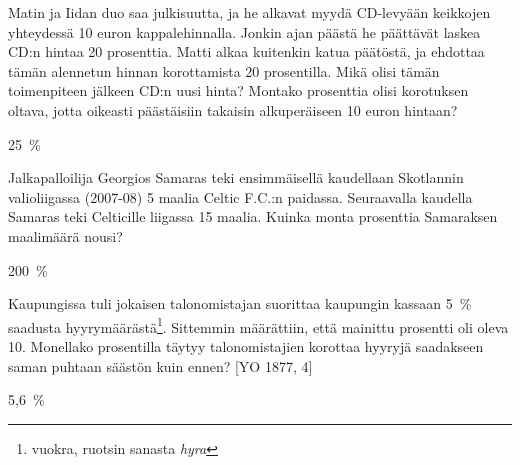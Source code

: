 \begin{tehtava}
Matin ja Iidan duo saa julkisuutta, ja he alkavat myydä CD-levyään keikkojen yhteydessä 10 euron kappalehinnalla. Jonkin ajan päästä he päättävät laskea CD:n hintaa 20 prosenttia. Matti alkaa kuitenkin katua päätöstä, ja ehdottaa tämän alennetun hinnan korottamista 20 prosentilla. Mikä olisi tämän toimenpiteen jälkeen CD:n uusi hinta? Montako prosenttia olisi korotuksen oltava, jotta oikeasti päästäisiin takaisin alkuperäiseen 10 euron hintaan?
    \begin{vastaus}
25~\%
    \end{vastaus}
\end{tehtava}

\begin{tehtava}
Jalkapalloilija Georgios Samaras teki ensimmäisellä kaudellaan Skotlannin valioliigassa (2007-08) 5 maalia Celtic F.C.:n paidassa. Seuraavalla kaudella Samaras teki Celticille liigassa 15 maalia. Kuinka monta prosenttia Samaraksen maalimäärä nousi?
    \begin{vastaus}
200~\%
    \end{vastaus}
\end{tehtava}

\begin{tehtava}
 Kaupungissa tuli jokaisen talonomistajan suorittaa kaupungin kassaan 5~\% saadusta hyyrymäärästä\footnote{vuokra, ruotsin sanasta \emph{hyra}}. Sittemmin määrättiin, että mainittu prosentti oli oleva 10. Monellako prosentilla täytyy talonomistajien korottaa hyyryjä saadakseen saman puhtaan säästön kuin ennen? [YO 1877, 4]
    \begin{vastaus}
5,6~\%
    \end{vastaus}
\end{tehtava}
